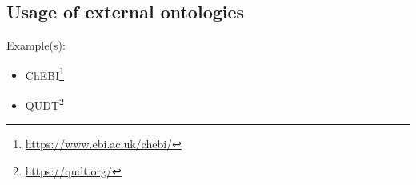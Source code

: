 \subsection{Usage of external ontologies}

Example(s): 
\begin{itemize}
    \item ChEBI\footnote{\url{https://www.ebi.ac.uk/chebi/}}
    \item QUDT\footnote{\url{https://qudt.org/}}
\end{itemize}
